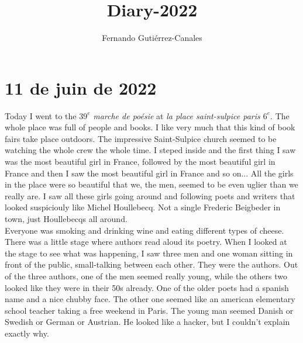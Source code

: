 \documentclass{article}
\title{\textbf{Diary-2022}}
\author{Fernando Gutiérrez-Canales}
\date{}
\begin{document}
\maketitle

\section{11 de juin de 2022}

Today I went to the \( 39^{e}  \) \textit{marche de poésie} at \textit{la place saint-sulpice paris \( 6 ^{e} \)}. The whole place was full of people and books. I like very much that this kind of book fairs take place outdoors. The impressive Saint-Sulpice church seemed to be watching the whole crew the whole time. I steped inside and the first thing I saw was the most beautiful girl in France, followed by the most beautiful girl in France and then I saw the most beautiful girl in France and so on... All the girls in the place were so beautiful that we, the men, seemed to be even uglier than we really are. I saw all these girls going around and following poets and writers that looked suspiciouly like Michel Houllebecq. Not a single Frederic Beigbeder in town, just Houllebecqs all around.\\

Everyone was smoking and drinking wine and eating different types of cheese. There was a little stage where authors read aloud its poetry. When I looked at the stage to see what was happening, I saw three men and one woman sitting in front of the public, small-talking between each other. They were the authors. Out of the three authors, one of the men seemed really young, while the others two looked like they were in their 50s already. One of the older poets had a spanish name and a nice chubby face. The other one seemed like an american elementary school teacher taking a free weekend in Paris. The young man seemed Danish or Swedish or German or Austrian. He looked like a hacker, but I couldn't explain exactly why. \\
\end{document}
